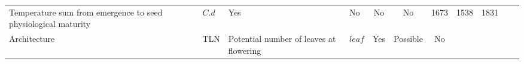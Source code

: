 \documentclass[a4paper]{article}
\begin{document}
\begin{longtable}[]{@{}llllccccrrr@{}}
\begin{minipage}[t]{0.19\columnwidth}
Temperature sum from emergence to seed physiological maturity\strut
\end{minipage} & \begin{minipage}[t]{0.06\columnwidth}\raggedright\strut
\(C.d\)\strut
\end{minipage} & \begin{minipage}[t]{0.06\columnwidth}\centering\strut
Yes\strut
\end{minipage} & \begin{minipage}[t]{0.08\columnwidth}\centering\strut
No\strut
\end{minipage} & \begin{minipage}[t]{0.05\columnwidth}\centering\strut
No\strut
\end{minipage} & \begin{minipage}[t]{0.04\columnwidth}\centering\strut
No\strut
\end{minipage} & \begin{minipage}[t]{0.04\columnwidth}\raggedleft\strut
1673\strut
\end{minipage} & \begin{minipage}[t]{0.04\columnwidth}\raggedleft\strut
1538\strut
\end{minipage} & \begin{minipage}[t]{0.04\columnwidth}\raggedleft\strut
1831\strut
\end{minipage}\tabularnewline
\begin{minipage}[t]{0.08\columnwidth}\raggedright\strut
Architecture\strut
\end{minipage} & \begin{minipage}[t]{0.05\columnwidth}\raggedright\strut
TLN\strut
\end{minipage} & \begin{minipage}[t]{0.19\columnwidth}\raggedright\strut
Potential number of leaves at flowering\strut
\end{minipage} & \begin{minipage}[t]{0.06\columnwidth}\raggedright\strut
\(leaf\)\strut
\end{minipage} & \begin{minipage}[t]{0.06\columnwidth}\centering\strut
Yes\strut
\end{minipage} & \begin{minipage}[t]{0.08\columnwidth}\centering\strut
Possible\strut
\end{minipage} & \begin{minipage}[t]{0.05\columnwidth}\centering\strut
No\strut
\end{minipage} & \begin{minipage}[t]{0.04\columnwidth}\centering\strut

\end{minipage}
\end{longtable}
\end{document}

